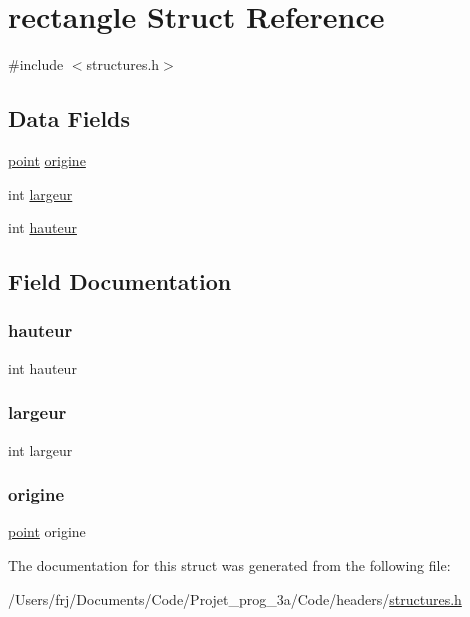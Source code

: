 \hypertarget{structrectangle}{}\section{rectangle Struct Reference}
\label{structrectangle}


{\ttfamily \#include $<$structures.\+h$>$}

\subsection*{Data Fields}
\begin{DoxyCompactItemize}
\item 
\hyperlink{structpoint}{point} \hyperlink{structrectangle_a52a08a00d432ad1428716bbc5659e634}{origine}
\item 
int \hyperlink{structrectangle_a74f0f2591e5f65bf792b2c3c67817d78}{largeur}
\item 
int \hyperlink{structrectangle_a5e94a2f98c16e8b6860f95c99da1c0d3}{hauteur}
\end{DoxyCompactItemize}


\subsection{Field Documentation}
\hypertarget{structrectangle_a5e94a2f98c16e8b6860f95c99da1c0d3}{}\label{structrectangle_a5e94a2f98c16e8b6860f95c99da1c0d3} 
\subsubsection{\texorpdfstring{hauteur}{hauteur}}
{\footnotesize\ttfamily int hauteur}

\hypertarget{structrectangle_a74f0f2591e5f65bf792b2c3c67817d78}{}\label{structrectangle_a74f0f2591e5f65bf792b2c3c67817d78} 
\subsubsection{\texorpdfstring{largeur}{largeur}}
{\footnotesize\ttfamily int largeur}

\hypertarget{structrectangle_a52a08a00d432ad1428716bbc5659e634}{}\label{structrectangle_a52a08a00d432ad1428716bbc5659e634} 
\subsubsection{\texorpdfstring{origine}{origine}}
{\footnotesize\ttfamily \hyperlink{structpoint}{point} origine}



The documentation for this struct was generated from the following file\+:\begin{DoxyCompactItemize}
\item 
/\+Users/frj/\+Documents/\+Code/\+Projet\+\_\+prog\+\_\+3a/\+Code/headers/\hyperlink{structures_8h}{structures.\+h}\end{DoxyCompactItemize}
